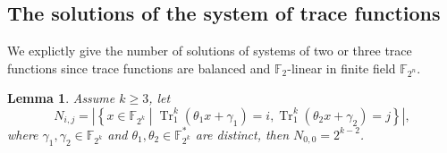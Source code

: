\documentclass{article}
\newcommand{\F}{\mathbb{F}}
\newcommand{\TRACE}{\operatorname{Tr}_1^k}
\newtheorem{lemma}{Lemma}
\theoremstyle{nonumberplain}
\newcommand{\0}{\textbf{0}}
\newcommand{\1}{\textbf{1}}
\begin{document}
        
    

\subsection{The solutions of the system of trace functions}
    We explictly give the number of solutions of systems of two or three trace functions since  
    trace functions are balanced and $ \F_2 $-linear in finite field $ \F_{2^n} $.
    \begin{lemma}\label{lemma:N_ij_trace}
        Assume  $ k\ge 3 $, let 
        \[ N_{i,j} =\left\lvert\left\{x\in\F_{2^k}\middle|\TRACE\left(\theta_1x+\gamma_1\right)=i,\TRACE\left(\theta_2x+\gamma_2\right)=j\right\}\right\rvert, \]
        where  $ \gamma_1,\gamma_2\in\F_{2^k} $ and $ \theta_1,\theta_2\in\F_{2^k}^* $ are distinct, then $ N_{0,0} =2^{k-2} $.
    \end{lemma}   
   
\end{document}
